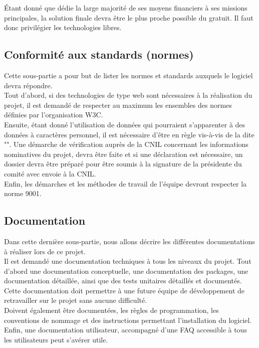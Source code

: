 Étant donné que \nomClient{} dédie la large majorité de ses moyens financiers à ses missions principales, la solution finale devra être le plus proche possible du gratuit. Il faut donc privilégier les technologies libres.


\subsection{Conformité aux standards (normes)}
Cette sous-partie a pour but de lister les normes et standards auxquels le logiciel devra répondre.\\

Tout d'abord, si des technologies de type web sont nécessaires à la réalisation du projet, il est demandé de respecter au maximum les ensembles des normes définies par l'organisation W3C.\\

Ensuite, étant donné l'utilisation de données qui pourraient s'apparenter à des données à caractères personnel, il est nécessaire d'être en règle vis-à-vis de la \loiInfoLib{} dite "\loiInfoLibCourt{}". Une démarche de vérification auprès de la CNIL concernant les informations nominatives du projet, devra être faite et si une déclaration est nécessaire, un dossier devra être préparé pour être soumis à la signature de la présidente du comité avec envoie à la CNIL.\\

Enfin, les démarches et les méthodes de travail de l'équipe \PICCourt{} devront respecter la norme \ISOCourt{} 9001.

\subsection{Documentation}
\label{doc}
Dans cette dernière sous-partie, nous allons décrire les différentes documentations à réaliser lors de ce projet.\\

Il est demandé une documentation techniques à tous les niveaux du projet. Tout d'abord une documentation conceptuelle, une documentation des packages, une documentation détaillée, ainsi que des tests unitaires détaillés et documentés. Cette documentation doit permettre à une future équipe de développement de retravailler sur le projet sans aucune difficulté.\\

Doivent également être documentées, les règles de programmation, les conventions de nommage et des instructions permettant l'installation du logiciel.\\

Enfin, une documentation utilisateur, accompagné d'une FAQ accessible à tous les utilisateurs peut s'avérer utile.
